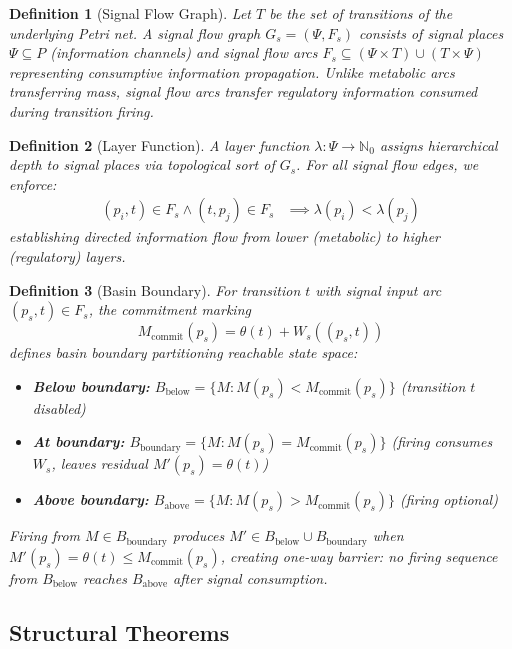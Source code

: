 \documentclass[10pt,letterpaper]{article}
\newtheorem{definition}{Definition}
\begin{document}
\begin{definition}[Signal Flow Graph]
Let $T$ be the set of transitions of the underlying Petri net. A signal flow graph $G_s = (\Psi, F_s)$ consists of signal places $\Psi \subseteq P$ (information channels) and signal flow arcs $F_s \subseteq (\Psi \times T) \cup (T \times \Psi)$ representing consumptive information propagation. Unlike metabolic arcs transferring mass, signal flow arcs transfer regulatory information consumed during transition firing.
\end{definition}

\begin{definition}[Layer Function]
A layer function $\lambda: \Psi \rightarrow \mathbb{N}_0$ assigns hierarchical depth to signal places via topological sort of $G_s$. For all signal flow edges, we enforce:
\begin{align*}
(p_i,t) \in F_s \wedge (t,p_j) \in F_s &\implies \lambda(p_i) < \lambda(p_j)
\end{align*}
establishing directed information flow from lower (metabolic) to higher (regulatory) layers.
\end{definition}

\begin{definition}[Basin Boundary]
For transition $t$ with signal input arc $(p_s,t) \in F_s$, the commitment marking
\begin{equation*}
M_{\text{commit}}(p_s) = \theta(t) + W_s((p_s,t))
\end{equation*}
defines basin boundary partitioning reachable state space:
\begin{itemize}
\item \textbf{Below boundary:} $B_{\text{below}} = \{M : M(p_s) < M_{\text{commit}}(p_s)\}$ (transition $t$ disabled)
\item \textbf{At boundary:} $B_{\text{boundary}} = \{M : M(p_s) = M_{\text{commit}}(p_s)\}$ (firing consumes $W_s$, leaves residual $M'(p_s) = \theta(t)$)
\item \textbf{Above boundary:} $B_{\text{above}} = \{M : M(p_s) > M_{\text{commit}}(p_s)\}$ (firing optional)
\end{itemize}
Firing from $M \in B_{\text{boundary}}$ produces $M' \in B_{\text{below}} \cup B_{\text{boundary}}$ when
$M'(p_s) = \theta(t) \leq M_{\text{commit}}(p_s)$,
creating one-way barrier: no firing sequence from $B_{\text{below}}$ reaches $B_{\text{above}}$ after signal consumption.
\end{definition}

\subsection{Structural Theorems}
\end{document}
